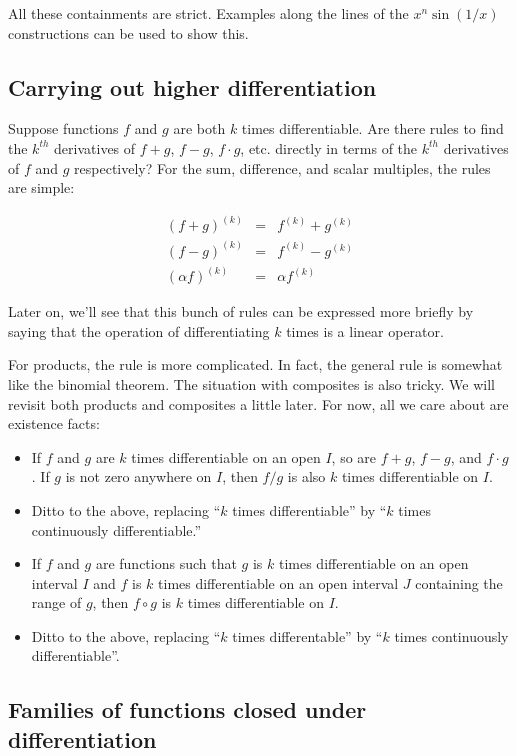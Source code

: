 \documentclass[10pt]{amsart}
\begin{document}
All these containments are strict. Examples along the lines of the
$x^n\sin(1/x)$ constructions can be used to show this.

\subsection{Carrying out higher differentiation}

Suppose functions $f$ and $g$ are both $k$ times differentiable. Are
there rules to find the $k^{th}$ derivatives of $f + g$, $f - g$, $f
\cdot g$, etc. directly in terms of the $k^{th}$ derivatives of $f$
and $g$ respectively? For the sum, difference, and scalar multiples, the rules are simple:

\begin{eqnarray*}
  (f + g)^{(k)} & = & f^{(k)} + g^{(k)}\\
  (f - g)^{(k)} & = & f^{(k)} - g^{(k)}\\
  (\alpha f)^{(k)} & = & \alpha f^{(k)}
\end{eqnarray*}

Later on, we'll see that this bunch of rules can be expressed more
briefly by saying that the operation of differentiating $k$ times is a
linear operator.

For products, the rule is more complicated. In fact, the general rule
is somewhat like the binomial theorem. The situation with composites
is also tricky. We will revisit both products and composites a little
later. For now, all we care about are existence facts:

\begin{itemize}
\item If $f$ and $g$ are $k$ times differentiable on an open $I$, so
  are $f + g$, $f - g$, and $f \cdot g$. If $g$ is not zero anywhere
  on $I$, then $f/g$ is also $k$ times differentiable on $I$.
\item Ditto to the above, replacing ``$k$ times differentiable'' by
  ``$k$ times continuously differentiable.''
\item If $f$ and $g$ are functions such that $g$ is $k$ times
  differentiable on an open interval $I$ and $f$ is $k$ times
  differentiable on an open interval $J$ containing the range of $g$,
  then $f \circ g$ is $k$ times differentiable on $I$.
\item Ditto to the above, replacing ``$k$ times differentable'' by
  ``$k$ times continuously differentiable''.
\end{itemize}

\subsection{Families of functions closed under differentiation}
\end{document}
